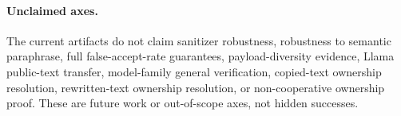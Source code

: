 \paragraph{Unclaimed axes.}
The current artifacts do not claim sanitizer robustness, robustness to semantic
paraphrase, full false-accept-rate guarantees, payload-diversity evidence,
Llama public-text transfer, model-family general verification, copied-text
ownership resolution, rewritten-text ownership resolution, or non-cooperative
ownership proof.  These are future work or out-of-scope axes, not hidden
successes.
